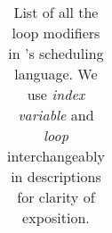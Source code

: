 \begin{table}[htb]
{\begin{tabularx}{\linewidth}{c | l | l}
  \bottomrule
  \end{tabularx}
  }
  \vskip 5pt
  \caption{\label{Tab:LoopModifiers} List of all the loop modifiers in \Treebeard{}'s scheduling language. We use \emph{index variable}
  and \emph{loop} interchangeably in descriptions for clarity of exposition.}
\end{table}






